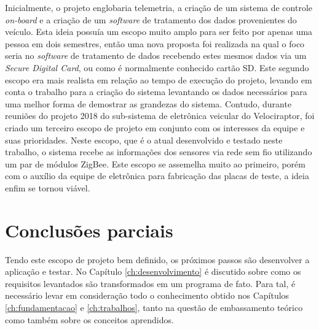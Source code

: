 Inicialmente, o projeto englobaria telemetria, a criação de um sistema de controle \textit{on-board} e a criação de um \textit{software} de tratamento dos dados provenientes do veículo. Esta ideia possuía um escopo muito amplo para ser feito por apenas uma pessoa em dois semestres, então uma nova proposta foi realizada na qual o foco seria no \textit{software} de tratamento de dados recebendo estes mesmos dados via um \textit{Secure Digital Card}, ou como é normalmente conhecido cartão SD. Este segundo escopo era mais realista em relação ao tempo de execução do projeto, levando em conta o trabalho para a criação do sistema levantando os dados necessários para uma melhor forma de demostrar as grandezas do sistema. Contudo, durante reuniões do projeto 2018 do sub-sistema de eletrônica veicular do Velociraptor, foi criado um terceiro escopo de projeto em conjunto com os interesses da equipe e suas prioridades. Neste escopo, que é o atual desenvolvido e testado neste trabalho, o sistema recebe as informações dos sensores via rede sem fio utilizando um par de módulos ZigBee. Este escopo se assemelha muito ao primeiro, porém com o auxílio da equipe de eletrônica para fabricação das placas de teste, a ideia enfim se tornou viável.

\section{Conclusões parciais}
Tendo este escopo de projeto bem definido, os próximos passos são desenvolver a aplicação e testar. No Capítulo \ref{ch:desenvolvimento} é discutido sobre como os requisitos levantados são transformados em um programa de fato. Para tal, é necessário levar em consideração todo o conhecimento obtido nos Capítulos \ref{ch:fundamentacao} e \ref{ch:trabalhos}, tanto na questão de embassamento teórico como também sobre os conceitos aprendidos.  